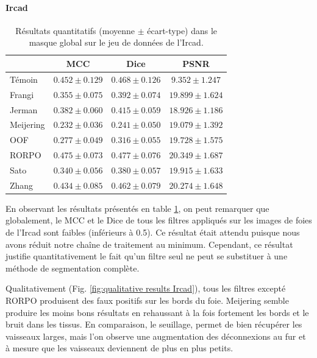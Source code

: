 \paragraph{Ircad}
\begin{table}[!ht]
  \begin{center}
      \caption{Résultats quantitatifs (moyenne $\pm$ écart-type) dans le masque global \maskglobal sur le jeu de données de l'Ircad.}
      \label{tab:quantitative results Ircad}
      \begin{tabular}{lccc}
          \hline
          & MCC & Dice & PSNR \\ 
          \hline
          Témoin	& $ 0.452 \pm 0.129	$ & $ 0.468 \pm	0.126 $ & $	9.352  \pm  1.247 $ \\
          Frangi	    & $ 0.355 \pm 0.075	$ & $ 0.392 \pm	0.074 $ & $	19.899 \pm 	1.624 $ \\
          Jerman	    & $ 0.382 \pm 0.060	$ & $ 0.415 \pm	0.059 $ & $	18.926 \pm 	1.186 $ \\
          Meijering   & $ 0.232 \pm 0.036	$ & $ 0.241 \pm	0.050 $ & $	19.079 \pm 	1.392 $ \\
          OOF	        & $ 0.277 \pm 0.049	$ & $ 0.316 \pm	0.055 $ & $	19.728 \pm 	1.575 $ \\
          RORPO	    & $ 0.475 \pm 0.073	$ & $ 0.477 \pm	0.076 $ & $	20.349 \pm 	1.687 $ \\
          Sato	    & $ 0.340 \pm 0.056	$ & $ 0.380 \pm	0.057 $ & $	19.915 \pm 	1.633 $ \\
          Zhang	    & $ 0.434 \pm 0.085	$ & $ 0.462 \pm	0.079 $ & $	20.274 \pm 	1.648 $ \\
    
          \hline
      \end{tabular}  
      \end{center}    
\end{table}
En observant les résultats présentés en table \ref{tab:quantitative results Ircad}, on peut remarquer que globalement, le MCC et le Dice de tous les filtres appliqués sur les images de foies de l'Ircad sont faibles (inférieurs à 0.5). Ce résultat était attendu puisque nous avons réduit notre chaîne de traitement au minimum. Cependant, ce résultat justifie quantitativement le fait qu'un filtre seul ne peut se substituer à une méthode de segmentation complète.

Qualitativement (Fig. \ref{fig:qualitative results Ircad}), tous les filtres excepté RORPO produisent des faux positifs sur les bords du foie. Meijering semble produire les moins bons résultats en rehaussant à la fois fortement les bords et le bruit dans les tissus. En comparaison, le seuillage, permet de bien récupérer les vaisseaux larges, mais l'on observe une augmentation des déconnexions au fur et à mesure que les vaisseaux deviennent de plus en plus petits. 

